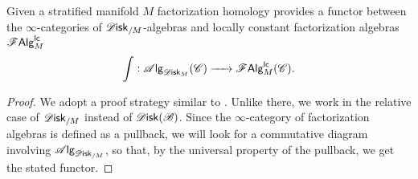 \documentclass[../text]{subfiles}
\begin{document}
\begin{proposition}\label{prop:fh_disk_to_lcfa}
    Given a stratified manifold $M$ factorization homology provides a functor between the $\infty$-categories of $\disk_{/M}$-algebras and locally constant factorization algebras $\mathscr{F} \mathsf{Alg}^{\mathsf{lc}}_M$
    \begin{equation}
        \int : \alg{\disk_M} (\catC) \xrightarrow{\ \ \ \ } \lcfa_M (\catC).
    \end{equation}
\end{proposition}

\begin{proof}
    We adopt a proof strategy similar to \cite[prop.3.14]{af_primer}. Unlike there, we work in the relative case of $\disk_{/M}$ instead of $\disk(\bstr)$. Since the $\infty$-category of factorization algebras is defined as a pullback, we will look for a commutative diagram involving $\alg{\disk_{/M}}$, so that, by the universal property of the pullback, we get the stated functor.
    

\end{proof}
\end{document}
